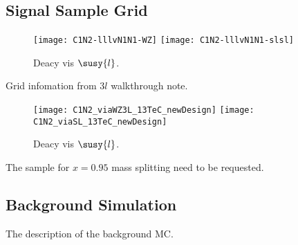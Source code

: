 \subsection{Signal Sample Grid}
\begin{figure}
  \centering
  \texttt{[image: C1N2-lllvN1N1-WZ]}
  \texttt{[image: C1N2-lllvN1N1-slsl]}
  \caption{Deacy vis $\susy{l}$.}
  \label{fig_grid_sl}
\end{figure}
Grid infomation from $3l$ walkthrough note.
\begin{figure}
  \centering
  \texttt{[image: C1N2\_viaWZ3L\_13TeC\_newDesign]}
  \texttt{[image: C1N2\_viaSL\_13TeC\_newDesign]}
  \caption{Deacy vis $\susy{l}$.}
  \label{fig_grid_sl}
\end{figure}


The sample for $x=0.95$ mass splitting need to be requested.

\subsection{Background Simulation}
The description of the background MC.

